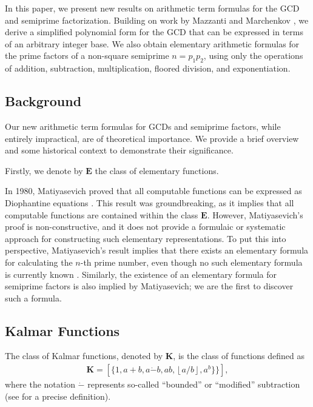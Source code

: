 \documentclass[11pt,reqno]{article}
\theoremstyle{plain}
\theoremstyle{definition}
\newcommand{\floor}[1]{\left\lfloor #1 \right\rfloor}
\begin{document}
In this paper, we present new results on arithmetic term formulas for the GCD and semiprime factorization. Building on work by Mazzanti and Marchenkov \cite{mazzanti2002plainbases, marchenkov1980superposition}, we derive a simplified polynomial form for the GCD that can be expressed in terms of an arbitrary integer base. We also obtain elementary arithmetic formulas for the prime factors of a non-square semiprime $n=p_1 p_2$, using only the operations of addition, subtraction, multiplication, floored division, and exponentiation.

\subsection{Background}
Our new arithmetic term formulas for GCDs and semiprime factors, while entirely impractical, are of theoretical importance. We provide a brief overview and some historical context to demonstrate their significance.

Firstly, we denote by $\textbf{E}$ the class of elementary functions.

In 1980, Matiyasevich proved that all computable functions can be expressed as Diophantine equations \cite{matiyasevich1980diophantine, matiyasevich1993hilbert}. This result was groundbreaking, as it implies that all computable functions are contained within the class $\textbf{E}$. However, Matiyasevich's proof is non-constructive, and it does not provide a formulaic or systematic approach for constructing such elementary representations. To put this into perspective, Matiyasevich's result implies that there exists an elementary formula for calculating the $n$-th prime number, even though no such elementary formula is currently known \cite{prunescu2024factorial}. Similarly, the existence of an elementary formula for semiprime factors is also implied by Matiyasevich; we are the first to discover such a formula.

\subsection{Kalmar Functions}
 The class of Kalmar functions, denoted by $\textbf{K}$, is the class of functions defined as
\begin{align*}
    \textbf{K} = [\{ 1, a+b, a\Dot{-}b, ab, \floor{a/b}, a^b \} \}],
\end{align*}
where the notation $\Dot{-}$ represents so-called ``bounded'' or ``modified'' subtraction (see \cite{mazzanti2002plainbases} for a precise definition).
\end{document}
